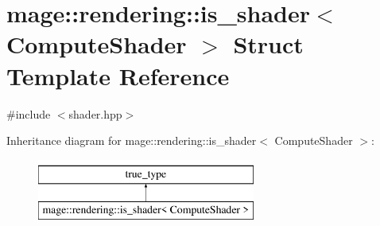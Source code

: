 \hypertarget{structmage_1_1rendering_1_1is__shader_3_01_compute_shader_01_4}{}\section{mage\+:\+:rendering\+:\+:is\+\_\+shader$<$ Compute\+Shader $>$ Struct Template Reference}
\label{structmage_1_1rendering_1_1is__shader_3_01_compute_shader_01_4}


{\ttfamily \#include $<$shader.\+hpp$>$}

Inheritance diagram for mage\+:\+:rendering\+:\+:is\+\_\+shader$<$ Compute\+Shader $>$\+:\begin{figure}[H]
\begin{center}
\leavevmode
\includegraphics[height=2.000000cm]{structmage_1_1rendering_1_1is__shader_3_01_compute_shader_01_4}
\end{center}
\end{figure}
